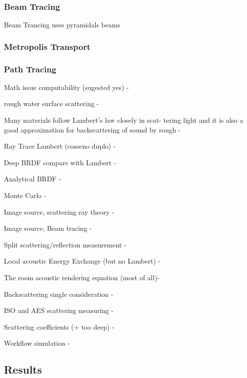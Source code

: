 \subsubsection{Beam Tracing}

Beam Trancing uses pyramidals beams 

\subsubsection{Metropolis Transport}
\subsubsection{Path Tracing}


Math issue computability (sugested yes) -
\citet{reif1994computability,blakey2014ray}

rough water surface scattering - \citet{jones2009modelling}

Many materials follow Lambert's law closely in scat-
tering light and it is also a good approximation for
backscattering of sound by rough - \citet{blake1995remote}

Ray Trace Lambert (cosseno duplo) - \citet{cox2004acoustic}

Deep BRDF compare with Lambert - \citet{miller2015real}


Analytical BRDF - \citet{durany2015analytical}

Monte Carlo - \citet{munjal2013formulas}

Image source, scattering ray theory - \citet{chandak2011fast} 

Image source, Beam tracing - \citet{funkhouser2003survey}

Split scattering/reflection measurement - \citet{vorlander2000definition}

Local acoustic Energy Exchange (but no Lambert) - \citet{rober2007ray}

The room acoustic rendering equation (most of all)- \citet{siltanen2007room}

Backscattering single consideration - \citet{LURTON,Etter2013}

ISO and AES scattering measuring - \citet{rindel2001scattering}

Scattering coefficients (+ too deep) - \citet{cox2006tutorial}

Workflow simulation - \citet{bell1997simulation}

\subsection{Results}
